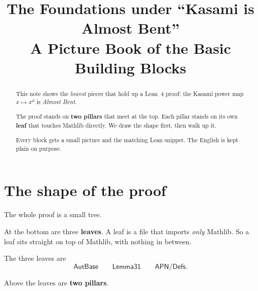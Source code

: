 \documentclass[11pt]{article}
\title{\bf The Foundations under ``Kasami is Almost Bent''\\[3pt]
  \large A Picture Book of the Basic Building Blocks}
\author{}
\date{}
\begin{document}
\maketitle

\begin{abstract}\noindent
This note shows the \emph{lowest} pieces that hold up a Lean~4 proof:
the Kasami power map $x \mapsto x^{d}$ is \emph{Almost Bent}.

The proof stands on \textbf{two pillars} that meet at the top.
Each pillar stands on its own \textbf{leaf} that touches Mathlib directly.
We draw the shape first, then walk up it.

Every block gets a small picture and the matching Lean snippet.
The English is kept plain on purpose.
\end{abstract}

\bigskip

\section{The shape of the proof}

The whole proof is a small tree.

At the bottom are three \textbf{leaves}.
A leaf is a file that imports \emph{only} Mathlib.
So a leaf sits straight on top of Mathlib, with nothing in between.

The three leaves are
\[
  \textsf{AutBase} \qquad \textsf{Lemma31} \qquad \textsf{APN/Defs} .
\]

Above the leaves are \textbf{two pillars}.
\end{document}
